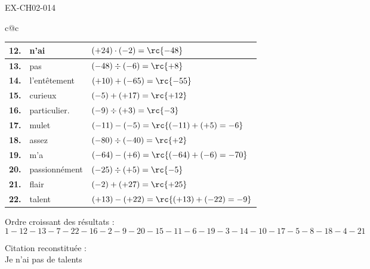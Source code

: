 \begin{solution}{EX-CH02-014}
\begin{center}
\begin{tabular}{c@{\hspace{8mm}}c}
  \begin{tabular}{|>{\centering\arraybackslash}p{6mm}|p{2.5cm}|p{4.0cm}|}
    \hline
    \cellcolor{gray!40}\textbf{12.} &n'ai& $(+24)\cdot(-2)=\rc{-48}$             \\ \hline
    \cellcolor{gray!40}\textbf{13.} &pas& $(-48)\div(-6)=\rc{+8}$               \\ \hline
    \cellcolor{gray!40}\textbf{14.} &l'entêtement& $(+10)+(-65)=\rc{-55}$                \\ \hline
    \cellcolor{gray!40}\textbf{15.} &curieux& $(-5)+(+17)=\rc{+12}$                 \\ \hline
    \cellcolor{gray!40}\textbf{16.} &particulier.& $(-9)\div(+3)=\rc{-3}$                \\ \hline
    \cellcolor{gray!40}\textbf{17.} &mulet& $(-11)-(-5)=\rc{(-11)+(+5)=-6}$       \\ \hline
    \cellcolor{gray!40}\textbf{18.} &assez& $(-80)\div(-40)=\rc{+2}$              \\ \hline
    \cellcolor{gray!40}\textbf{19.} &m'a& $(-64)-(+6)=\rc{(-64)+(-6)=-70}$      \\ \hline
    \cellcolor{gray!40}\textbf{20.} &passionnément& $(-25)\div(+5)=\rc{-5}$               \\ \hline
    \cellcolor{gray!40}\textbf{21.} &flair& $(-2)+(+27)=\rc{+25}$                 \\ \hline
    \cellcolor{gray!40}\textbf{22.} &talent& $(+13)-(+22)=\rc{(+13)+(-22)=-9}$     \\ \hline
  \end{tabular}

\end{tabular}
\end{center}

\bigskip
\noindent Ordre croissant des résultats :
\[
  1 - 12 - 13 - 7 - 22 - 16 - 2 - 9 - 20 - 15 - 11 - 6 - 19 - 3 - 14 - 10 - 17 - 5 - 8 - 18 - 4 - 21
\]

\bigskip
\noindent Citation reconstituée :\\
Je n'ai pas de talents 


\end{solution}